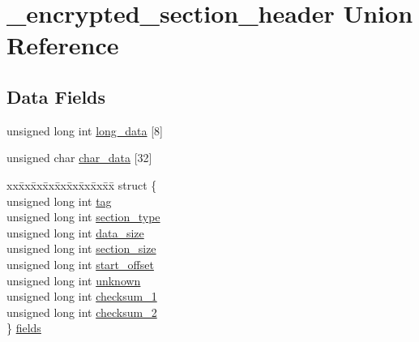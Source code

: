 \hypertarget{union__encrypted__section__header}{\section{\-\_\-encrypted\-\_\-section\-\_\-header \-Union \-Reference}
\label{union__encrypted__section__header}
}
\subsection*{\-Data \-Fields}
\begin{DoxyCompactItemize}
\item 
unsigned long int \hyperlink{union__encrypted__section__header_ac8231caac942a17fa80b1f2f9cf50ce4}{long\-\_\-data} \mbox{[}8\mbox{]}
\item 
unsigned char \hyperlink{union__encrypted__section__header_a1377ace2175b5f607cdb548b5d6c79e2}{char\-\_\-data} \mbox{[}32\mbox{]}
\item 
\begin{tabbing}
xx\=xx\=xx\=xx\=xx\=xx\=xx\=xx\=xx\=\kill
struct \{\\
\>unsigned long int \hyperlink{union__encrypted__section__header_aa75b122b856a48553322c09d2c763614}{tag}\\
\>unsigned long int \hyperlink{union__encrypted__section__header_a8d2930ea5ea9a5969f123916193ce7da}{section\_type}\\
\>unsigned long int \hyperlink{union__encrypted__section__header_afd8e77d45a87dd17453802698d82fee4}{data\_size}\\
\>unsigned long int \hyperlink{union__encrypted__section__header_a982c4a123c5fba6edfd901162089553f}{section\_size}\\
\>unsigned long int \hyperlink{union__encrypted__section__header_ac175595a9413b18eeccd1ba0af98995d}{start\_offset}\\
\>unsigned long int \hyperlink{union__encrypted__section__header_af59fced20be27fa7707301d529bd6556}{unknown}\\
\>unsigned long int \hyperlink{union__encrypted__section__header_af0a32fff19f4f02875b9b569faef4afb}{checksum\_1}\\
\>unsigned long int \hyperlink{union__encrypted__section__header_ad2caaf2abf58832bc167a9d671d5d66b}{checksum\_2}\\
\} \hyperlink{union__encrypted__section__header_ad44960fc15707c8edb0f5b1275156ea3}{fields}\\

\end{tabbing}\end{DoxyCompactItemize}


